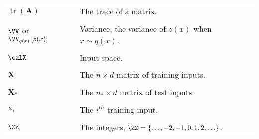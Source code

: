 \begin{longtable}{lp{}}
    $\operatorname{tr} \left( \bm{A} \right)$                                                                  & The trace of a matrix.
    \\\\
    $\VV$ or $\VV_{q(x)} \left[ z(x) \right]$                                                                  & Variance, the variance of $z(x)$ when $x \sim q(x)$.
    \\\\
    $\calX$                                                                                                    & Input space.
    \\\\
    $\bm{X}$                                                                                                   & The $n \times d$ matrix of training inputs.
    \\\\
    $\bm{X}_{\ast}$                                                                                            & The $n_{\ast} \times d$ matrix of test inputs.
    \\\\
    $\bm{x}_{i}$                                                                                               & The $i^{th}$ training input.
    \\\\
    $\ZZ$                                                                                                      & The integers, $\ZZ = \left\{ \ldots ,-2,-1,0,1,2,\ldots \right\}$.

    \\\bottomrule
    \hline
\end{longtable}

